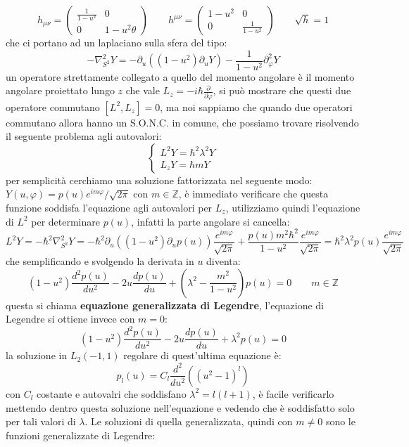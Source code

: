 \[h_{\mu\nu} = \begin{pmatrix}
\frac{1}{1-u^2}& 0\\
0 & 1-u^2\theta
\end{pmatrix} \qquad h^{\mu\nu} = \begin{pmatrix}
1-u^2 & 0\\
0 & \frac{1}{1-u^2}
\end{pmatrix}\qquad \sqrt{h} = 1\]
che ci portano ad un laplaciano sulla sfera del tipo:
\[-\nabla_{S^2}^2Y = -\partial_u((1-u^2)\partial_uY) - \frac{1}{1-u^2}\partial_\varphi^2Y\]
un operatore strettamente collegato a quello del momento angolare è il momento angolare proiettato lungo $z$ che vale $L_z = -i\hbar\frac{\partial}{\partial\varphi}$, si può mostrare che questi due operatore commutano $[L^2,L_z] = 0$, ma noi sappiamo che quando due operatori commutano allora hanno un S.O.N.C. in comune, che possiamo trovare risolvendo il seguente problema agli autovalori:
\begin{equation}\label{probautovalori}\begin{cases}
L^2Y = \hbar^2\lambda^2Y\\
L_zY = \hbar m Y
\end{cases}\end{equation}
per semplicità cerchiamo una soluzione fattorizzata nel seguente modo: $Y(u,\varphi) = p(u)e^{im\varphi}/\sqrt{2\pi}$ con $m\in\mathbb{Z}$, è immediato verificare che questa funzione soddisfa l'equazione agli autovalori per $L_z$, utilizziamo quindi l'equazione di $L^2$ per determinare $p(u)$, infatti la parte angolare si cancella:
\[L^2Y = -\hbar^2\nabla_{S^2}^2Y = -\hbar^2\partial_u((1-u^2)\partial_up(u))\frac{e^{im\varphi}}{\sqrt{2\pi}} + \frac{p(u)m^2\hbar^2}{1-u^2}\frac{e^{im\varphi}}{\sqrt{2\pi}} = \hbar^2\lambda^2p(u)\frac{e^{im\varphi}}{\sqrt{2\pi}}\]
che semplificando e svolgendo la derivata in $u$ diventa:
\[(1-u^2)\frac{d^2p(u)}{du^2} - 2u\frac{dp(u)}{du}+\left(\lambda^2 -\frac{m^2}{1-u^2}\right)p(u)=0 \qquad m\in\mathbb{Z}\]
questa si chiama \textbf{equazione generalizzata di Legendre}, l'equazione di Legendre si ottiene invece con $m=0$:
\[(1-u^2)\frac{d^2p(u)}{du^2} - 2u\frac{dp(u)}{du}+\lambda^2p(u)=0\]
la soluzione in $L_2(-1,1)$ regolare di quest'ultima equazione è:
\[p_l(u) = C_l\frac{d^2}{du^2}\left((u^2-1)^l\right)\]
con $C_l$ costante e autovalri che soddisfano $\lambda^2 = l(l+1)$, è facile verificarlo mettendo dentro questa soluzione nell'equazione e vedendo che è soddisfatto solo per tali valori di $\lambda$. Le soluzioni di quella generalizzata, quindi con $m\neq0$ sono le funzioni generalizzate di Legendre:
